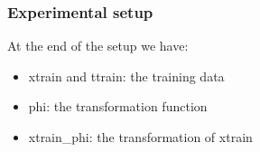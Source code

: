 \documentclass[a4]{article}
\begin{document}
\subsubsection{Experimental setup}
%
%
%
At the end of the setup we have:
\begin{itemize}
	\item xtrain and ttrain: the training data
	\item phi: the transformation function
	\item xtrain\_phi: the transformation of xtrain
\end{itemize} 
\end{document}
